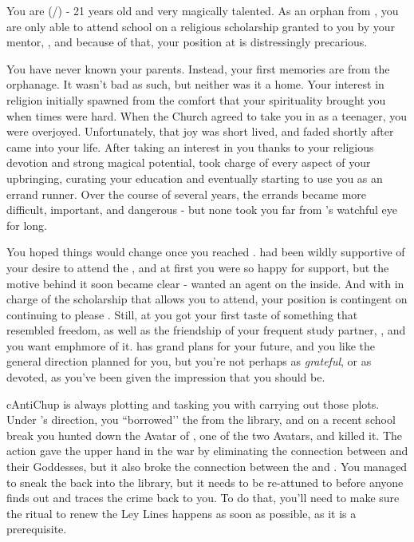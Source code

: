 \documentclass[char]{GL2020}
\begin{document}
\name{\cScholarship{}}

You are \cScholarship{} (\cScholarship{\they}/\cScholarship{\them}) - 21 years old and very magically talented. As an orphan from \pTech{}, you are only able to attend school on a religious scholarship granted to you by your mentor, \cAntiChup{}, and because of that, your position at \pSchool{} is distressingly precarious.

You have never known your parents. Instead, your first memories are from the orphanage. It wasn’t bad as such, but neither was it a home. Your interest in religion initially spawned from the comfort that your spirituality brought you when times were hard. When the Church agreed to take you in as a teenager, you were overjoyed. Unfortunately, that joy was short lived, and faded shortly after \cAntiChup{} came into your life. After taking an interest in you thanks to your religious devotion and strong magical potential, \cAntiChup{} took charge of every aspect of your upbringing, curating your education and eventually starting to use you as an errand runner. Over the course of several years, the errands became more difficult, important, and dangerous - but none took you far from \cAntiChup{}’s watchful eye for long.

You hoped things would change once you reached \pSchool{}. \cAntiChup{} had been wildly supportive of your desire to attend the \pSc{}, and at first you were so happy for \cAntiChup{\their} support, but the motive behind it soon became clear - \cAntiChup{\they} wanted an agent on the inside. And with \cAntiChup{} in charge of the scholarship that allows you to attend, your position is contingent on continuing to please \cAntiChup{\them}. Still, at \pSchool{} you got your first taste of something that resembled freedom, as well as the friendship of your frequent study partner, \cTechStar{}, and you want emph{more} of it.  \cAntiChup{} has grand plans for your future, and you like the general direction planned for you, but you're not perhaps as \emph{grateful}, or as devoted, as you’ve been given the impression that you should be.

cAntiChup{} is always plotting and tasking you with carrying out those plots. Under \cAntiChup{}’s direction, you ``borrowed’’ the \iNet{} from the \pSc{} library, and on a recent school break you hunted down the Avatar of \cEbb{\full}, one of the two \pShip{} Avatars, and killed it. The action gave \pTech{} the upper hand in the war by eliminating the connection between \pShip{} and their Goddesses, but it also broke the connection between the \iNet{} and \pShip{}. You managed to sneak the \iNet{} back into the library, but it needs to be re-attuned to \pShip{} before anyone finds out and traces the crime back to you. To do that, you’ll need to make sure the ritual to renew the Ley Lines happens as soon as possible, as it is a prerequisite.
\end{document}
